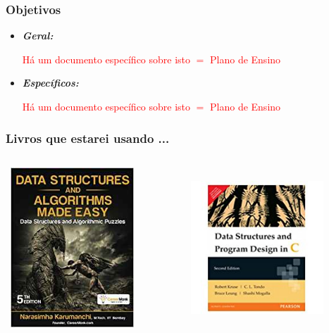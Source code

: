 \begin{frame} [allowframebreaks=0.9]
\frametitle{Objetivos}

\begin{itemize}
\item \emph{\textbf{Geral:}} 
 
 \textcolor{red}{Há um documento específico sobre isto $=$ Plano de Ensino}


\newpage
\item \emph{\textbf{Específicos:}} 

    \textcolor{red}{Há um documento específico sobre isto $=$ Plano de Ensino}


\end{itemize}

\end{frame}


\begin{frame}
\frametitle{Livros que estarei usando ...}

\begin{columns}
\begin{column}{.5\textwidth}
\centering
\includegraphics[height=6cm, width=5cm]{figs/fig_gerais/capa_livro_made_easy.jpeg}

\end{column}

\begin{column}{.5\textwidth}
\centering
\includegraphics[height=6cm, width=5cm]{figs/fig_gerais/capa_livro_program_design_C.jpeg}

\end{column}

\end{columns}


\end{frame}

